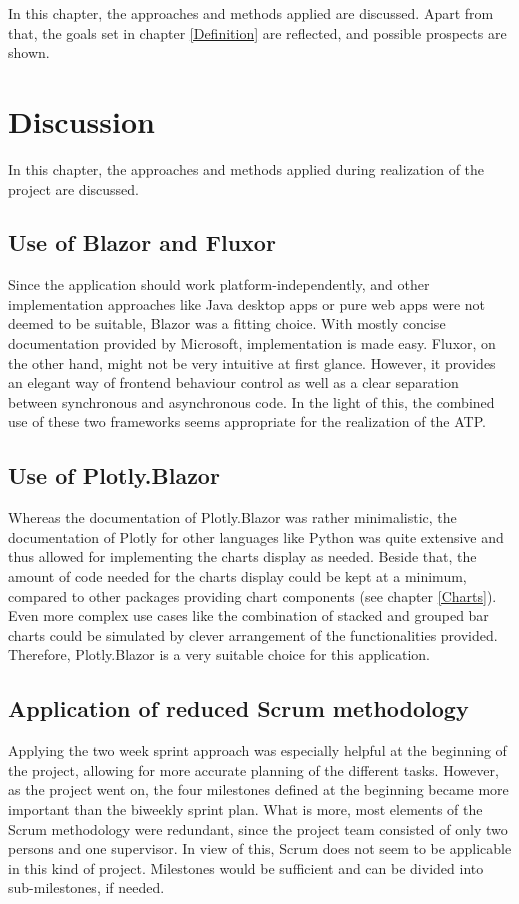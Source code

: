 
In this chapter, the approaches and methods applied are discussed. Apart from that, the goals set in chapter \ref{Definition} are reflected, and possible prospects are shown.

\section{Discussion}
In this chapter, the approaches and methods applied during realization of the project are discussed.

\subsection{Use of Blazor and Fluxor}
Since the application should work platform-independently, and other implementation approaches like Java desktop apps or pure web apps were not deemed to be suitable, Blazor was a fitting choice. With mostly concise documentation provided by Microsoft, implementation is made easy. Fluxor, on the other hand, might not be very intuitive at first glance. However, it provides an elegant way of frontend behaviour control as well as a clear separation between synchronous and asynchronous code. In the light of this, the combined use of these two frameworks seems appropriate for the realization of the ATP.

\subsection{Use of Plotly.Blazor}
Whereas the documentation of Plotly.Blazor was rather minimalistic, the documentation of Plotly for other languages like Python was quite extensive and thus allowed for implementing the charts display as needed. Beside that, the amount of code needed for the charts display could be kept at a minimum, compared to other packages providing chart components (see chapter \ref{Charts}). Even more complex use cases like the combination of stacked and grouped bar charts could be simulated by clever arrangement of the functionalities provided. Therefore, Plotly.Blazor is a very suitable choice for this application.

\subsection{Application of reduced Scrum methodology}
Applying the two week sprint approach was especially helpful at the beginning of the project, allowing for more accurate planning of the different tasks. However, as the project went on, the four milestones defined at the beginning became more important than the biweekly sprint plan. What is more, most elements of the Scrum methodology were redundant, since the project team consisted of only two persons and one supervisor. In view of this, Scrum does not seem to be applicable in this kind of project. Milestones would be sufficient and can be divided into sub-milestones, if needed.

